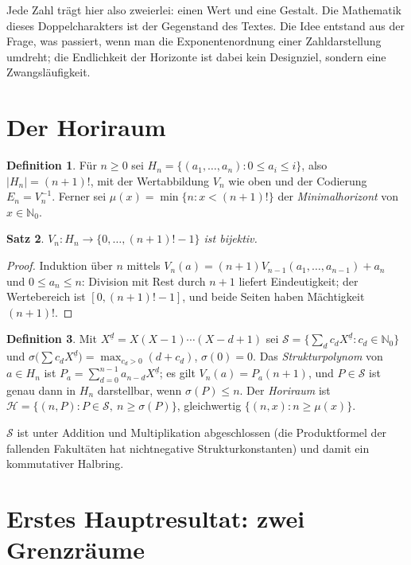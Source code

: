 \documentclass[11pt]{article}
\newtheorem{satz}{Satz}[section]
\theoremstyle{definition}
\newtheorem{definition}[satz]{Definition}
\theoremstyle{remark}
\newcommand{\Hori}{\mathcal H}
\newcommand{\Struk}{\mathcal S}
\newcommand{\NN}{\mathbb N_0}
\newcommand{\ff}[2]{#1^{\underline{#2}}}
\begin{document}
Jede Zahl trägt hier also zweierlei: einen Wert und eine Gestalt.
Die Mathematik dieses Doppelcharakters ist der Gegenstand des
Textes. Die Idee entstand aus der Frage, was passiert, wenn man die
Exponentenordnung einer Zahldarstellung umdreht; die Endlichkeit der
Horizonte ist dabei kein Designziel, sondern eine Zwangsläufigkeit.

\section{Der Horiraum}

\begin{definition}
Für $n\ge0$ sei $H_n=\{(a_1,\dots,a_n):0\le a_i\le i\}$, also
$|H_n|=(n+1)!$, mit der Wertabbildung $V_n$ wie oben und der
Codierung $E_n=V_n^{-1}$. Ferner sei
$\mu(x)=\min\{n:x<(n+1)!\}$ der \emph{Minimalhorizont} von
$x\in\NN$.
\end{definition}

\begin{satz}\label{satz:bij}
$V_n\colon H_n\to\{0,\dots,(n+1)!-1\}$ ist bijektiv.
\end{satz}

\begin{proof}
Induktion über $n$ mittels
$V_n(a)=(n+1)V_{n-1}(a_1,\dots,a_{n-1})+a_n$ und $0\le a_n\le n$:
Division mit Rest durch $n+1$ liefert Eindeutigkeit; der Wertebereich
ist $[0,(n+1)!-1]$, und beide Seiten haben Mächtigkeit $(n+1)!$.
\end{proof}

\begin{definition}
Mit $\ff Xd=X(X-1)\cdots(X-d+1)$ sei
$\Struk=\bigl\{\sum_d c_d\ff Xd:c_d\in\NN\bigr\}$ und
$\sigma\bigl(\sum c_d\ff Xd\bigr)=\max_{c_d>0}(d+c_d)$,
$\sigma(0)=0$. Das \emph{Strukturpolynom} von $a\in H_n$ ist
$P_a=\sum_{d=0}^{n-1}a_{n-d}\ff Xd$; es gilt $V_n(a)=P_a(n+1)$, und
$P\in\Struk$ ist genau dann in $H_n$ darstellbar, wenn
$\sigma(P)\le n$. Der \emph{Horiraum} ist
$\Hori=\{(n,P):P\in\Struk,\ n\ge\sigma(P)\}$, gleichwertig
$\{(n,x):n\ge\mu(x)\}$.
\end{definition}

$\Struk$ ist unter Addition und Multiplikation abgeschlossen (die
Produktformel der fallenden Fakultäten hat nichtnegative
Strukturkonstanten) und damit ein kommutativer Halbring.

\section{Erstes Hauptresultat: zwei Grenzräume}
\end{document}
